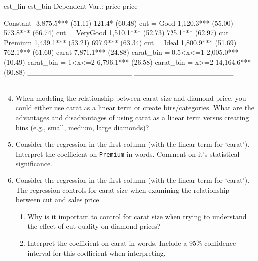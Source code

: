 \documentclass[12pt]{article}
\begin{document}
  \begin{smallcodeblock}[{}]
                                 est_lin             est_bin
Dependent Var.:                    price               price
                                                            
Constant             -3,875.5*** (51.16)      121.4* (60.48)
cut = Good            1,120.3*** (55.00)    573.8*** (66.74)
cut = VeryGood        1,510.1*** (52.73)    725.1*** (62.97)
cut = Premium         1,439.1*** (53.21)    697.9*** (63.34)
cut = Ideal           1,800.9*** (51.69)    762.1*** (61.60)
carat                 7,871.1*** (24.88)                    
carat_bin = 0.5<x<=1                      2,005.0*** (10.49)
carat_bin = 1<x<=2                        6,796.1*** (26.58)
carat_bin = x>=2                         14,164.6*** (60.88)
____________________ ___________________ ___________________
  \end{smallcodeblock}


\begin{enumerate}
  \setcounter{enumi}{3}
  \item When modeling the relationship between carat size and diamond price, you could either use carat as a linear term or create bins/categories. 
  What are the advantages and disadvantages of using carat as a linear term versus creating bins (e.g., small, medium, large diamonds)?
  
  \bigskip
  \item Consider the regression in the first column (with the linear term for `carat'). 
  Interpret the coefficient on \texttt{Premium} in words. Comment on it's statistical significance.
  
  \bigskip
  \item Consider the regression in the first column (with the linear term for `carat'). The regression controls for carat size when examining the relationship between cut and sales price.
  \begin{enumerate}[label=(\alph*)]
    \item Why is it important to control for carat size when trying to understand the effect of cut quality on diamond prices?
    
    \item Interpret the coefficient on carat in words. Include a 95\% confidence interval for this coefficient when interpreting.
  \end{enumerate}
\end{enumerate}
\end{document}
